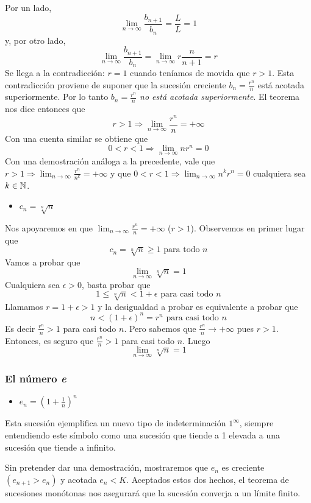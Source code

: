 \documentclass[../teoria.root.tex]{subfiles}
\begin{document}
Por un lado, \[\lim_{n\to\infty}\frac{b_{n+1}}{b_n}=\frac{L}{L}=1\]
y, por otro lado, \[\lim_{n\to\infty}\frac{b_{n+1}}{b_n}=\lim_{n\to\infty}r\frac{n}{n+1}=r\]
Se llega a la contradicción: \(r=1\) cuando teníamos de movida que \(r>1\).
Esta contradicción proviene de suponer que la sucesión creciente \(b_n=\frac{r^n}{n}\) está acotada superiormente.
Por lo tanto \(b_n=\frac{r^n}{n}\) \textit{no está acotada superiormente}.
El teorema nos dice entonces que \[r>1\Rightarrow\lim_{n\to\infty}\frac{r^n}{n}=+\infty\]
Con una cuenta similar se obtiene que \[0<r<1\Rightarrow\lim_{n\to\infty}nr^n=0\]
Con una demostración análoga a la precedente, vale que
\(r>1\Rightarrow\lim_{n\to\infty}\frac{r^n}{n^k}=+\infty\) y que \(0<r<1\Rightarrow\lim_{n\to\infty}n^kr^n=0\) cualquiera sea \(k\in\mathbb{N}\).
\begin{itemize}
	\item \(c_n=\sqrt[n]{n}\)
\end{itemize}
Nos apoyaremos en que \(\lim_{n\to\infty}\frac{r^n}{n}=+\infty\) (\(r>1\)).
Observemos en primer lugar que \[c_n=\sqrt[n]{n}\geq1\text{ para todo }n\]
Vamos a probar que \[\lim_{n\to\infty}\sqrt[n]{n}=1\]
Cualquiera sea \(\epsilon>0\), basta probar que \[1\leq\sqrt[n]{n}<1+\epsilon\text{ para casi todo }n\]
Llamamos \(r=1+\epsilon>1\) y la desigualdad a probar es equivalente a probar que \[n<(1+\epsilon)^n=r^n\text{ para casi todo }n\]
Es decir \(\frac{r^n}{n}>1\) para casi todo \(n\).
Pero sabemos que \(\frac{r^n}{n}\rightarrow+\infty\) pues \(r>1\).
Entonces, es seguro que \(\frac{r^n}{n}>1\) para casi todo \(n\).
Luego \[\lim_{n\to\infty}\sqrt[n]{n}=1\]
\subsubsection{El número \textit{e}}
\begin{itemize}
	\item \(e_n=\left(1+\frac{1}{n}\right)^n\)
\end{itemize}
Esta sucesión ejemplifica un nuevo tipo de indeterminación \(1^\infty\), siempre entendiendo este símbolo como una sucesión que tiende a 1 elevada a una sucesión que tiende a infinito.

Sin pretender dar una demostración, mostraremos que \(e_n\) es creciente \((e_{n+1}>e_n)\) y acotada \(e_n<K\).
Aceptados estos dos hechos, el teorema de sucesiones monótonas nos asegurará que la sucesión converja a un límite finito.
\end{document}
